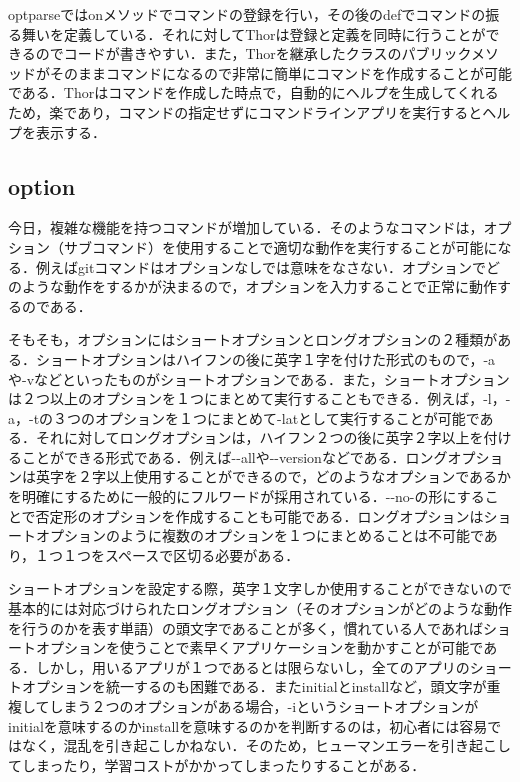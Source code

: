 \documentclass[11pt,dvipdfmx]{jsarticle}
\begin{document}
optparseではonメソッドでコマンドの登録を行い，その後のdefでコマンドの振る舞いを定義している．それに対してThorは登録と定義を同時に行うことができるのでコードが書きやすい．また，Thorを継承したクラスのパブリックメソッドがそのままコマンドになるので非常に簡単にコマンドを作成することが可能である．Thorはコマンドを作成した時点で，自動的にヘルプを生成してくれるため，楽であり，コマンドの指定せずにコマンドラインアプリを実行するとヘルプを表示する．

    \subsection{option}\label{option}

今日，複雑な機能を持つコマンドが増加している．そのようなコマンドは，オプション（サブコマンド）を使用することで適切な動作を実行することが可能になる．例えばgitコマンドはオプションなしでは意味をなさない．オプションでどのような動作をするかが決まるので，オプションを入力することで正常に動作するのである．

そもそも，オプションにはショートオプションとロングオプションの２種類がある．ショートオプションはハイフンの後に英字１字を付けた形式のもので，-aや-vなどといったものがショートオプションである．また，ショートオプションは２つ以上のオプションを１つにまとめて実行することもできる．例えば，-l，-a，-tの３つのオプションを１つにまとめて-latとして実行することが可能である．それに対してロングオプションは，ハイフン２つの後に英字２字以上を付けることができる形式である．例えば-\/-allや-\/-versionなどである．ロングオプションは英字を２字以上使用することができるので，どのようなオプションであるかを明確にするために一般的にフルワードが採用されている．-\/-no-の形にすることで否定形のオプションを作成することも可能である．ロングオプションはショートオプションのように複数のオプションを１つにまとめることは不可能であり，１つ１つをスペースで区切る必要がある．

ショートオプションを設定する際，英字１文字しか使用することができないので基本的には対応づけられたロングオプション（そのオプションがどのような動作を行うのかを表す単語）の頭文字であることが多く，慣れている人であればショートオプションを使うことで素早くアプリケーションを動かすことが可能である．しかし，用いるアプリが１つであるとは限らないし，全てのアプリのショートオプションを統一するのも困難である．またinitialとinstallなど，頭文字が重複してしまう２つのオプションがある場合，-iというショートオプションがinitialを意味するのかinstallを意味するのかを判断するのは，初心者には容易ではなく，混乱を引き起こしかねない．そのため，ヒューマンエラーを引き起こしてしまったり，学習コストがかかってしまったりすることがある．
\end{document}
